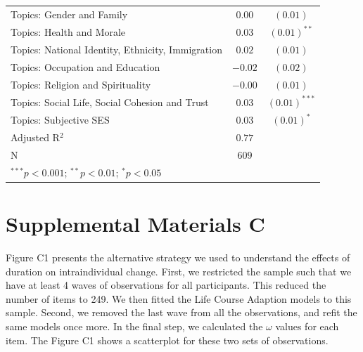 \documentclass[
  12pt,
]{article}
\begin{document}
\begin{table}[ht]
\begin{center}
\begin{tabular}{l c c}
Topics: Gender and Family                           & $0.00$        
                                                    & $(0.01)$      \\
Topics: Health and Morale                           & $0.03$   
                                                    & $(0.01)^{**}$      \\
Topics: National Identity, Ethnicity, Immigration   & $0.02$        
                                                    & $(0.01)$      \\
Topics: Occupation and Education                    & $-0.02$       
                                                    & $(0.02)$      \\
Topics: Religion and Spirituality                   & $-0.00$       
                                                    & $(0.01)$      \\
Topics: Social Life, Social Cohesion and Trust      & $0.03$  
                                                    & $(0.01)^{***}$      \\
Topics: Subjective SES                              & $0.03$    
                                                    & $(0.01)^{*}$      \\
\hline
Adjusted R$^2$                                      & $0.77$     &   \\
N                                                   & $609$      &  \\
\hline
\multicolumn{2}{l}{\scriptsize{$^{***}p<0.001$; $^{**}p<0.01$; $^{*}p<0.05$}}
\end{tabular}
\end{center}
\end{table}

\newpage

\hypertarget{supplemental-materials-c}{%
\section{Supplemental Materials C}\label{supplemental-materials-c}}

Figure C1 presents the alternative strategy we used to understand the
effects of duration on intraindividual change. First, we restricted the
sample such that we have at least 4 waves of observations for all
participants. This reduced the number of items to 249. We then fitted
the Life Course Adaption models to this sample. Second, we removed the
last wave from all the observations, and refit the same models once
more. In the final step, we calculated the \(\omega\) values for each
item. The Figure C1 shows a scatterplot for these two sets of
observations.
\end{document}
